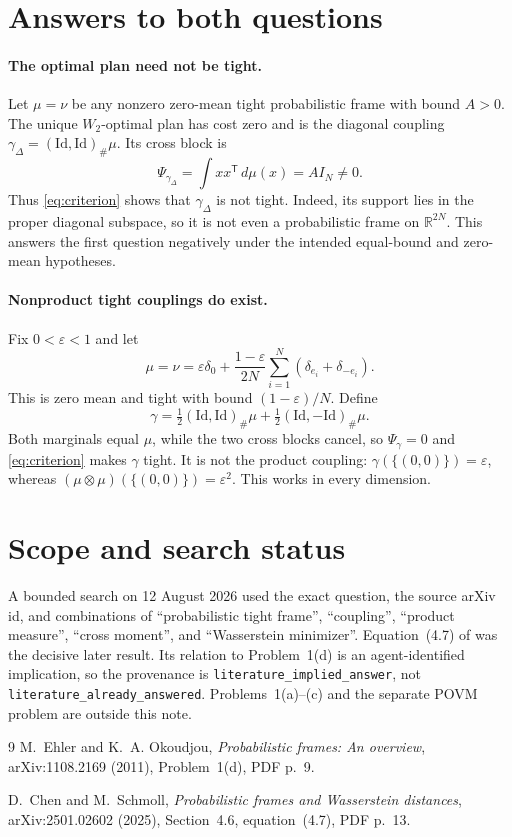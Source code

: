 \documentclass[11pt]{article}
\begin{document}
\section*{Answers to both questions}

\paragraph{The optimal plan need not be tight.}
Let $\mu=\nu$ be any nonzero zero-mean tight probabilistic frame with bound
$A>0$.  The unique $W_2$-optimal plan has cost zero and is the diagonal coupling
$\gamma_\Delta=(\mathrm{Id},\mathrm{Id})_\#\mu$.  Its cross block is
\[
 \Psi_{\gamma_\Delta}=\int xx^{\mathsf T}\,d\mu(x)=A I_N\neq0.
\]
Thus \eqref{eq:criterion} shows that $\gamma_\Delta$ is not tight.  Indeed, its
support lies in the proper diagonal subspace, so it is not even a probabilistic
frame on $\mathbb R^{2N}$.  This answers the first question negatively under
the intended equal-bound and zero-mean hypotheses.

\paragraph{Nonproduct tight couplings do exist.}
Fix $0<\varepsilon<1$ and let
\[
 \mu=\nu=\varepsilon\delta_0+
 \frac{1-\varepsilon}{2N}\sum_{i=1}^N
 (\delta_{e_i}+\delta_{-e_i}).
\]
This is zero mean and tight with bound $(1-\varepsilon)/N$.  Define
\[
 \gamma=\tfrac12(\mathrm{Id},\mathrm{Id})_\#\mu
       +\tfrac12(\mathrm{Id},-\mathrm{Id})_\#\mu.
\]
Both marginals equal $\mu$, while the two cross blocks cancel, so
$\Psi_\gamma=0$ and \eqref{eq:criterion} makes $\gamma$ tight.  It is not the
product coupling: $\gamma(\{(0,0)\})=\varepsilon$, whereas
$(\mu\otimes\mu)(\{(0,0)\})=\varepsilon^2$.  This works in every dimension.

\section*{Scope and search status}

A bounded search on 12 August 2026 used the exact question, the source arXiv
id, and combinations of ``probabilistic tight frame'', ``coupling'', ``product
measure'', ``cross moment'', and ``Wasserstein minimizer''.  Equation~(4.7) of
\cite{support} was the decisive later result.  Its relation to Problem~1(d) is
an agent-identified implication, so the provenance is
\texttt{literature\_implied\_answer}, not
\texttt{literature\_already\_answered}.  Problems~1(a)--(c) and the separate
POVM problem are outside this note.

\begin{thebibliography}{9}
M.~Ehler and K.~A. Okoudjou,
\emph{Probabilistic frames: An overview}, arXiv:1108.2169 (2011),
Problem~1(d), PDF p.~9.

D.~Chen and M.~Schmoll,
\emph{Probabilistic frames and Wasserstein distances},
arXiv:2501.02602 (2025), Section~4.6, equation~(4.7), PDF p.~13.
\end{thebibliography}
\end{document}
